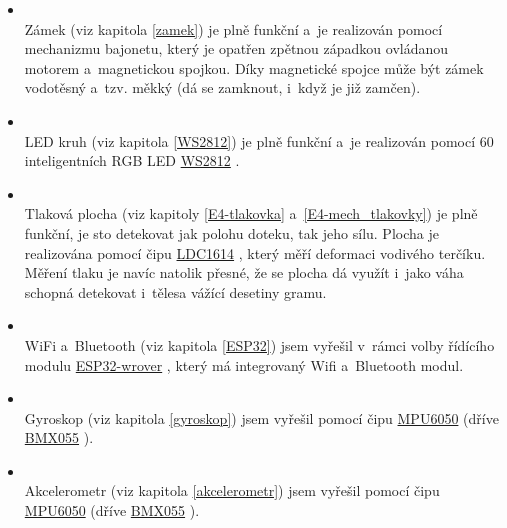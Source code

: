 \begin{itemize}
    \item {}  \\ Zámek (viz kapitola \ref{zamek}) je plně funkční a~je realizován pomocí mechanizmu bajonetu, který je opatřen zpětnou západkou ovládanou motorem a~magnetickou spojkou. 
        Díky magnetické spojce může být zámek vodotěsný a~tzv. měkký (dá se zamknout, i~když je již zamčen). 
    \item {} \\ LED kruh (viz kapitola \ref{WS2812}) je plně funkční a~je realizován pomocí 60 inteligentních RGB LED \href{https://cdn-shop.adafruit.com/datasheets/WS2812B.pdf}{WS2812} \parencite{WS2812}.
    \item {} \\ Tlaková plocha (viz kapitoly \ref{E4-tlakovka} a~\ref{E4-mech_tlakovky}) je plně funkční, 
        je sto detekovat jak polohu doteku, tak jeho sílu. 
        Plocha je realizována pomocí čipu \href{https://www.ti.com/lit/ds/symlink/ldc1612.pdf?ts=1612018658531&ref_url=https%253A%252F%252Fwww.google.com%252F}{LDC1614} \parencite{LDC1614}, 
        který měří deformaci vodivého terčíku. Měření tlaku je navíc natolik přesné, že se plocha dá využít i~jako váha schopná detekovat i~tělesa vážící 
        desetiny gramu. %
    \item {} \\ WiFi a~Bluetooth (viz kapitola \ref{ESP32}) jsem vyřešil v~rámci volby řídícího 
        modulu \href{https://www.espressif.com/sites/default/files/documentation/esp32-wrover-b_datasheet_en.pdf}{ESP32-wrover} 
        \parencite{ESP32-WROVER-B}, 
            který má integrovaný Wifi a~Bluetooth modul.
    \item {} \\ Gyroskop (viz kapitola \ref{gyroskop}) jsem vyřešil pomocí čipu \href{https://datasheet.lcsc.com/szlcsc/TDK-InvenSense-MPU-6050_C24112.pdf}{MPU6050} (dříve \href{https://datasheet.lcsc.com/szlcsc/Bosch-Sensortec-BMX055_C94022.pdf}{BMX055} \parencite{bmx055}).
    \item {} \\ Akcelerometr (viz kapitola \ref{akcelerometr}) jsem vyřešil pomocí čipu \href{https://datasheet.lcsc.com/szlcsc/TDK-InvenSense-MPU-6050_C24112.pdf}{MPU6050} (dříve \href{https://datasheet.lcsc.com/szlcsc/Bosch-Sensortec-BMX055_C94022.pdf}{BMX055} \parencite{bmx055}).

\end{itemize}
